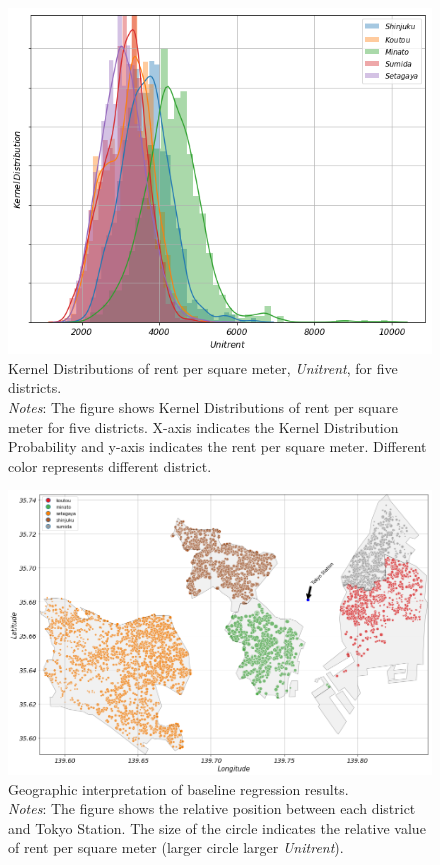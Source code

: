 \documentclass[a4paper, 12pt]{article} %
\newcommand{\var}[1][\textit]{#1}
\begin{document}
\begin{figure}
\centering
\includegraphics[scale=0.7]{kerneldist.png}
\caption{Kernel Distributions of rent per square meter, \var{Unitrent}, for five districts. \\
\textit{Notes}: The figure shows Kernel Distributions of rent per square meter for five districts. X-axis indicates the Kernel Distribution Probability and y-axis indicates the rent per square meter. Different color represents different district.}
\label{fig3}
\end{figure}

\newpage
\begin{landscape}
\begin{figure}
\centering
\includegraphics[scale=0.5]{interpretation.png}
\caption{Geographic interpretation of baseline regression results. \\
\textit{Notes}: The figure shows the relative position between each district and Tokyo Station. The size of the circle indicates the relative value of rent per square meter (larger circle larger \var{Unitrent}).}
\label{fig4}
\end{figure}
\end{landscape}
\end{document}
